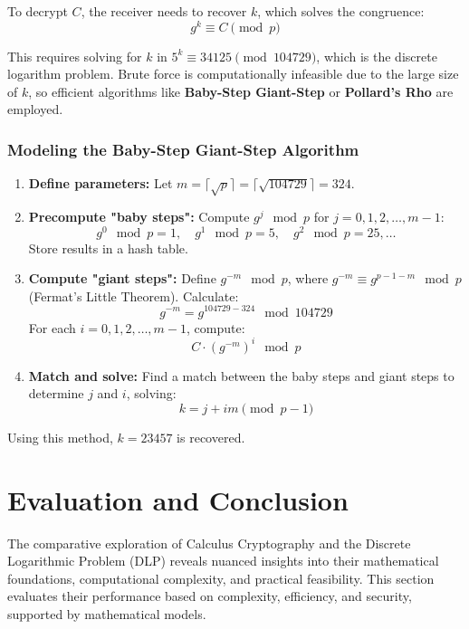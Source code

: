 \documentclass[12pt]{article}
\begin{document}
To decrypt \( C \), the receiver needs to recover \( k \), which solves the congruence:
\[
g^k \equiv C \pmod{p}
\]

This requires solving for \( k \) in \( 5^k \equiv 34125 \pmod{104729} \), which is the discrete logarithm problem. Brute force is computationally infeasible due to the large size of \( k \), so efficient algorithms like \textbf{Baby-Step Giant-Step} or \textbf{Pollard's Rho} are employed.

\subsubsection*{Modeling the Baby-Step Giant-Step Algorithm}
\begin{enumerate}
    \item \textbf{Define parameters:} Let \( m = \lceil \sqrt{p} \rceil = \lceil \sqrt{104729} \rceil = 324 \).

    \item \textbf{Precompute "baby steps":} Compute \( g^j \mod p \) for \( j = 0, 1, 2, \ldots, m - 1 \):
    \[
    g^0 \mod p = 1, \quad g^1 \mod p = 5, \quad g^2 \mod p = 25, \ldots
    \]
    Store results in a hash table.

    \item \textbf{Compute "giant steps":} Define \( g^{-m} \mod p \), where \( g^{-m} \equiv g^{p-1-m} \mod p \) (Fermat's Little Theorem). Calculate:
    \[
    g^{-m} = g^{104729 - 324} \mod 104729
    \]
    For each \( i = 0, 1, 2, \ldots, m - 1 \), compute:
    \[
    C \cdot (g^{-m})^i \mod p
    \]

    \item \textbf{Match and solve:} Find a match between the baby steps and giant steps to determine \( j \) and \( i \), solving:
    \[
    k = j + im \pmod{p-1}
    \]
\end{enumerate}

Using this method, \( k = 23457 \) is recovered.









\section*{Evaluation and Conclusion}

The comparative exploration of Calculus Cryptography and the Discrete Logarithmic Problem (DLP) reveals nuanced insights into their mathematical foundations, computational complexity, and practical feasibility. This section evaluates their performance based on complexity, efficiency, and security, supported by mathematical models.
\end{document}
